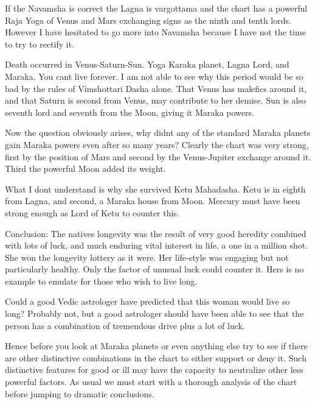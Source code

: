  

If the Navamsha is correct the Lagna is vargottama and the chart has a powerful Raja Yoga of Venus and Mars exchanging signs as the ninth and tenth lords. However I have hesitated to go more into Navamsha because I have not the time to try to rectify it.

 

Death occurred in Venus‑Saturn‑Sun. Yoga Karaka planet, Lagna Lord, and Maraka. You cant live forever. I am not able to see why this period would be so bad by the rules of Vimshottari Dasha alone. That Venus has malefics around it, and that Saturn is second from Venus, may contribute to her demise. Sun is also seventh lord and seventh from the Moon, giving it Maraka powers.

 

Now the question obviously arises, why didnt any of the standard Maraka planets gain Maraka powers even after so many years? Clearly the chart was very strong, first by the position of Mars and second by the Venus-Jupiter exchange around it. Third the powerful Moon added its weight.

 

What I dont understand is why she survived Ketu Mahadasha. Ketu is in eighth from Lagna, and second, a Maraka house from Moon. Mercury must have been strong enough as Lord of Ketu to counter this.

 

Conclusion: The natives longevity was the result of very good heredity combined with lots of luck, and much enduring vital interest in life, a one in a million shot. She won the longevity lottery as it were. Her life-style was engaging but not particularly healthy. Only the factor of unusual luck could counter it. Hers is no example to emulate for those who wish to live long.

 

Could a good Vedic astrologer have predicted that this woman would live so long? Probably not, but a good astrologer should have been able to see that the person has a combination of tremendous drive plus a lot of luck.

 

Hence before you look at Maraka planets or even anything else try to see if there are other distinctive combinations in the chart to either support or deny it. Such distinctive features for good or ill may have the capacity to neutralize other less powerful factors. As usual we must start with a thorough analysis of the chart before jumping to dramatic conclusions.